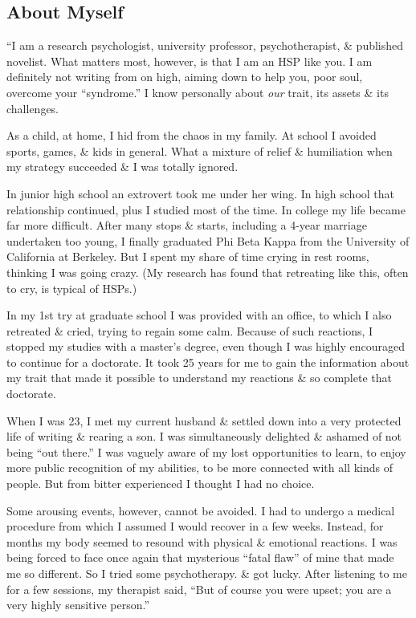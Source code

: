 \documentclass{article}
\numberwithin{equation}{section}
\begin{document}
\subsection*{About Myself}
``I am a research psychologist, university professor, psychotherapist, \& published novelist. What matters most, however, is that I am an HSP like you. I am definitely not writing from on high, aiming down to help you, poor soul, overcome your ``syndrome.'' I know personally about \textit{our} trait, its assets \& its challenges.

As a child, at home, I hid from the chaos in my family. At school I avoided sports, games, \& kids in general. What a mixture of relief \& humiliation when my strategy succeeded \& I was totally ignored.

In junior high school an extrovert took me under her wing. In high school that relationship continued, plus I studied most of the time. In college my life became far more difficult. After many stops \& starts, including a 4-year marriage undertaken too young, I finally graduated Phi Beta Kappa from the University of California at Berkeley. But I spent my share of time crying in rest rooms, thinking I was going crazy. (My research has found that retreating like this, often to cry, is typical of HSPs.)

In my 1st try at graduate school I was provided with an office, to which I also retreated \& cried, trying to regain some calm. Because of such reactions, I stopped my studies with a master's degree, even though I was highly encouraged to continue for a doctorate. It took 25 years for me to gain the information about my trait that made it possible to understand my reactions \& so complete that doctorate.

When I was 23, I met my current husband \& settled down into a very protected life of writing \& rearing a son. I was simultaneously delighted \& ashamed of not being ``out there.'' I was vaguely aware of my lost opportunities to learn, to enjoy more public recognition of my abilities, to be more connected with all kinds of people. But from bitter experienced I thought I had no choice.

Some arousing events, however, cannot be avoided. I had to undergo a medical procedure from which I assumed I would recover in a few weeks. Instead, for months my body seemed to resound with physical \& emotional reactions. I was being forced to face once again that mysterious ``fatal flaw'' of mine that made me so different. So I tried some psychotherapy. \& got lucky. After listening to me for a few sessions, my therapist said, ``But of course you were upset; you are a very highly sensitive person.''
\end{document}
